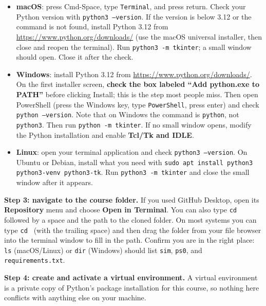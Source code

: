 \documentclass[11pt]{article}
\providecommand{\tightlist}{\setlength{\itemsep}{0pt}\setlength{\parskip}{0pt}}
\begin{document}
\begin{itemize}\tightlist
\item \textbf{macOS}: press Cmd-Space, type \texttt{Terminal}, and press
      return. Check your Python version with \texttt{python3 --version}.
      If the version is below 3.12 or the command is not found, install
      Python 3.12 from \url{https://www.python.org/downloads/} (use the
      macOS universal installer, then close and reopen the terminal). Run
      \texttt{python3 -m tkinter}; a small window should open. Close it after
      the check.
\item \textbf{Windows}: install Python 3.12 from
      \url{https://www.python.org/downloads/}. On the first installer
      screen, \textbf{check the box labeled ``Add python.exe to PATH''}
      before clicking Install; this is the step most people miss. Then
      open PowerShell (press the Windows key, type \texttt{PowerShell},
      press enter) and check \texttt{python --version}. Note that on
      Windows the command is \texttt{python}, not \texttt{python3}. Then run
      \texttt{python -m tkinter}. If no small window opens, modify the Python
      installation and enable \textbf{Tcl/Tk and IDLE}.
\item \textbf{Linux}: open your terminal application and check
      \texttt{python3 --version}. On Ubuntu or Debian, install what you
      need with \texttt{sudo apt install python3 python3-venv
      python3-tk}. Run \texttt{python3 -m tkinter} and close the small window
      after it appears.
\end{itemize}

\textbf{Step 3: navigate to the course folder.} If you used GitHub Desktop,
open its \textbf{Repository} menu and choose \textbf{Open in Terminal}. You
can also type \texttt{cd} followed by a space and the path to the cloned
folder. On most systems you can type \texttt{cd }
(with the trailing space) and then drag the folder from your file browser
into the terminal window to fill in the path. Confirm you are in the right
place: \texttt{ls} (macOS/Linux) or \texttt{dir} (Windows) should list
\texttt{sim}, \texttt{ps0}, and \texttt{requirements.txt}.

\textbf{Step 4: create and activate a virtual environment.} A virtual
environment is a private copy of Python's package installation for this
course, so nothing here conflicts with anything else on your machine.
\end{document}
